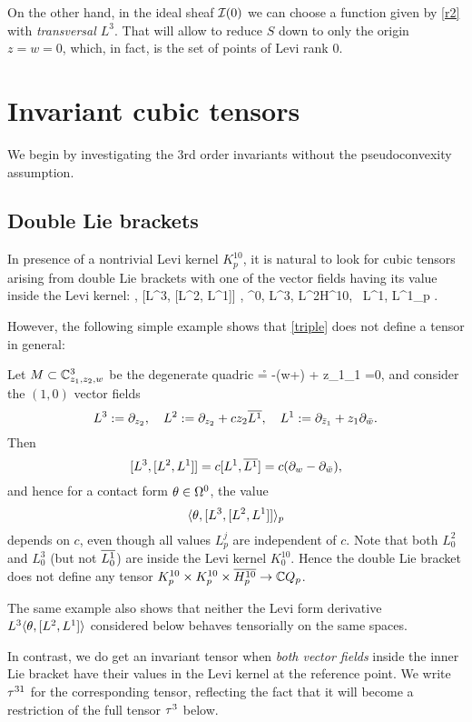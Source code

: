 \documentclass[12pt]{amsart}
\begin{document}
On the other hand, 
in the ideal sheaf ${\mathcal{I}}(0)$
we can choose a function given by \eqref{r2}
with {\em transversal $L^3$}.
That will allow to reduce $S$ down to only the origin 
$z=w=0$,
which, in fact, is the set of points of Levi rank $0$.
\ee




\section{Invariant cubic tensors}

We begin by investigating the $3$rd order invariants
without the pseudoconvexity assumption.

\subsection{Double Lie brackets}
In presence of a nontrivial Levi kernel $K^{10}_p$,
it is natural to look for cubic tensors
arising from double Lie brackets
with one of the vector fields 
having its value inside the Levi kernel: 
\beq{}
	\la \th, [L^3, [L^2, L^1]] \ra, 
	\quad
	\th \in \Om^0,
	\quad L^3, L^2\in H^{10}, 
	\, L^1\in {}, 
	\quad
	L^1_p \in {}.	
\eeq

However, the following simple example shows that 
\eqref{triple} does not define a tensor in general:

\be{}
Let $M\subset {\mathbb{C}}^3_{z_1, z_2, w}$ be
the degenerate quadric
\beq{}
	\r = -(w+\w) + z_1\z_1 =0,
\eeq
and consider the $(1,0)$ vector fields
$$
	L^3:= \partial_{z_2},
	\quad
	L^2:= \partial_{z_2} + cz_2 \overline{L^1},
	\quad
	L^1:= \partial_{{\bar z}_1} + z_1\partial_{{\bar w}}.
$$
Then 
$$
	[L^3, [L^2, L^1]] = c [L^1, \overline{L^1}] = c (\partial_{w} - \partial_{{\bar w}}),
$$
and hence for a contact form $\theta\in \Omega^0$,
the value $$\langle \theta, [L^3, [L^2, L^1]] \rangle_p$$
depends on $c$,
even though all values $L^j_p$ are independent of $c$.
Note that both $L^2_0$ and $L^3_0$ (but not $\overline{L^1_0}$)
are inside the Levi kernel $K^{10}_0$.
Hence the double Lie bracket does not define any tensor
$K^{10}_p\times K^{10}_p \times \overline{H^{10}_p}\to {\mathbb{C}} Q_p$.

The same example also shows that neither
the Levi form derivative $L^3 \langle \theta, [L^2, L^1]\rangle$
considered below
behaves tensorially on the same spaces.
\ee


In contrast, we do get an invariant tensor when {\em both vector fields}
inside the inner Lie bracket have their values in the Levi kernel
at the reference point.
We write $\tau^{31}$ for the corresponding tensor, 
reflecting the fact that it will become a restriction 
of the full tensor $\tau^3$ below.
\end{document}
